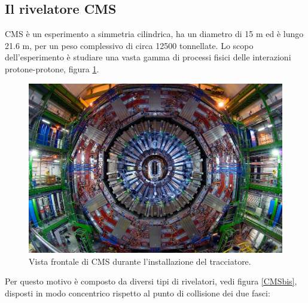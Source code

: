 \subsection{Il rivelatore CMS}
CMS è un esperimento a simmetria cilindrica, ha un diametro di 15 m ed è lungo 21.6 m, per un peso complessivo di circa 12500 tonnellate. Lo scopo dell'esperimento è studiare una vasta gamma di processi fisici delle interazioni protone-protone, figura \ref{CMS}. 
\begin{figure}
\centering
\includegraphics[scale=.2]{Immagini/CMS}
\caption{Vista frontale di CMS durante l'installazione del tracciatore.}
\label{CMS}
\end{figure}
Per questo motivo è composto da diversi tipi di rivelatori, vedi figura \ref{CMSbis}, disposti in modo concentrico rispetto al punto di collisione dei due fasci:
